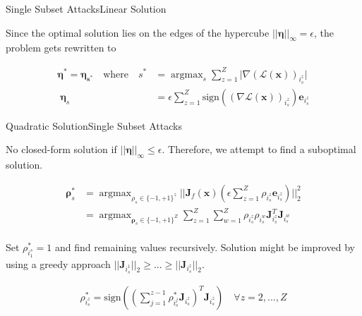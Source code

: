 \documentclass[xcolor={cmyk}]{beamer}
\newcommand{\mcl}{\mathcal}
\newcommand{\bm}{\boldsymbol}
\DeclareMathOperator*{\argmax}{argmax}
\begin{document}
\begin{frame}{Single Subset Attacks}{Linear Solution}

Since the optimal solution lies on the edges of the hypercube $\lvert\lvert \bm{\eta} \rvert\rvert_{\infty} = \epsilon$, the problem gets rewritten to

\begin{equation*}
\begin{aligned}
	\bm{\eta^{*}} = \bm{\eta_{s^*}} \quad \text{where} \quad s^{*} &= \argmax_s \sum_{z=1}^{Z} \lvert \nabla (\mcl{L}(\bm{x}))_{i^z_s} \rvert \\
	\; \bm{\eta}_s &= \epsilon \sum^{Z}_{z=1} \text{sign}((\nabla \mcl{L}(\bm{x}))_{i_s^z}) \bm{e}_{i^z_s}
\end{aligned}
\label{singlelinearsolution}
\end{equation*}

\end{frame}

\begin{frame}{Quadratic Solution}{Single Subset Attacks}

	No closed-form solution if $\lvert\lvert \bm{\eta} \rvert\rvert_{\infty} \leq \epsilon$. Therefore, we attempt to find a suboptimal solution.

	\begin{equation*}
	\begin{aligned}
		\bm{\rho}_s^* &= \argmax_{\rho_s \in \{-1, +1\}^z} \lvert\lvert \bm{J}_f(\bm{x})(\epsilon \sum_{z=1}^{Z} \rho_{i_s^z} \bm{e}_{i_s^z}) \rvert\rvert_2^2 \\
		&= \argmax_{\bm{\rho}_s \in \{-1, +1\}^Z} \sum_{z=1}^Z \sum_{w=1}^Z \rho_{i_s^z} \rho_{i_s^w} \bm{J}_{i_s^z}^T \bm{J}_{i_s^w}
	\end{aligned}
	\label{06_single_quadratic_solution_rho_2}
	\end{equation*}\\[10pt]

	Set $\rho_{i_1^s}^* = 1$ and find remaining values recursively. Solution might be improved by using a greedy approach $\lvert\lvert \bm{J}_{i_s^1} \rvert\rvert_2 \geq ... \geq \lvert\lvert \bm{J}_{i_s^z} \rvert\rvert_2$.

	\begin{equation*}
	\begin{aligned}
		\rho_{i_s^z}^* = \text{sign}((\sum_{j=1}^{z-1} \rho_{i_s^j}^* \bm{J}_{i_s^z})^T \bm{J}_{i_s^z}) \quad \forall z = 2, ..., Z
	\end{aligned}
	\label{06_single_quadratic_recursive}
	\end{equation*}

\end{frame}
\end{document}
